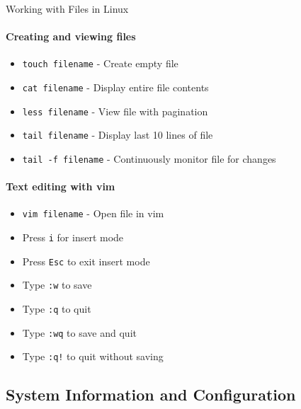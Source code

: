 \begin{KR}{Working with Files in Linux}
    \paragraph{Creating and viewing files}
    \begin{itemize}
        \item \texttt{touch filename} - Create empty file
        \item \texttt{cat filename} - Display entire file contents
        \item \texttt{less filename} - View file with pagination
        \item \texttt{tail filename} - Display last 10 lines of file
        \item \texttt{tail -f filename} - Continuously monitor file for changes
    \end{itemize}
    
    \paragraph{Text editing with vim}
    \begin{itemize}
        \item \texttt{vim filename} - Open file in vim
        \item Press \texttt{i} for insert mode
        \item Press \texttt{Esc} to exit insert mode
        \item Type \texttt{:w} to save
        \item Type \texttt{:q} to quit
        \item Type \texttt{:wq} to save and quit
        \item Type \texttt{:q!} to quit without saving
    \end{itemize}
\end{KR}

\multend

\subsection{System Information and Configuration}


